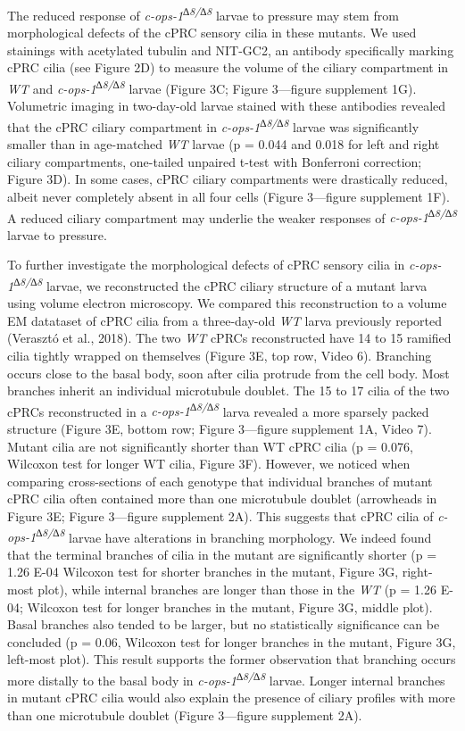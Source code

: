 \documentclass[
  11pt,
]{article}
\begin{document}
The reduced response of \emph{c-ops-1\textsuperscript{∆8/∆8}} larvae to
pressure may stem from morphological defects of the cPRC sensory cilia
in these mutants. We used stainings with acetylated tubulin and NIT-GC2,
an antibody specifically marking cPRC cilia (see Figure 2D) to measure
the volume of the ciliary compartment in \emph{WT} and
\emph{c-ops-1\textsuperscript{∆8/∆8}} larvae (Figure 3C; Figure
3---figure supplement 1G). Volumetric imaging in two-day-old larvae
stained with these antibodies revealed that the cPRC ciliary compartment
in \emph{c-ops-1\textsuperscript{∆8/∆8}} larvae was significantly
smaller than in age-matched \emph{WT} larvae (p = 0.044 and 0.018 for
left and right ciliary compartments, one-tailed unpaired t-test with
Bonferroni correction; Figure 3D). In some cases, cPRC ciliary
compartments were drastically reduced, albeit never completely absent in
all four cells (Figure 3---figure supplement 1F). A reduced ciliary
compartment may underlie the weaker responses of
\emph{c-ops-1\textsuperscript{∆8/∆8}} larvae to pressure.

To further investigate the morphological defects of cPRC sensory cilia
in \emph{c-ops-1\textsuperscript{∆8/∆8}} larvae, we reconstructed the
cPRC ciliary structure of a mutant larva using volume electron
microscopy. We compared this reconstruction to a volume EM datataset of
cPRC cilia from a three-day-old \emph{WT} larva previously reported
(Verasztó et al., 2018). The two \emph{WT} cPRCs reconstructed have 14
to 15 ramified cilia tightly wrapped on themselves (Figure 3E, top row,
Video 6). Branching occurs close to the basal body, soon after cilia
protrude from the cell body. Most branches inherit an individual
microtubule doublet. The 15 to 17 cilia of the two cPRCs reconstructed
in a \emph{c-ops-1\textsuperscript{∆8/∆8}} larva revealed a more
sparsely packed structure (Figure 3E, bottom row; Figure 3---figure
supplement 1A, Video 7). Mutant cilia are not significantly shorter than
WT cPRC cilia (p = 0.076, Wilcoxon test for longer WT cilia, Figure 3F).
However, we noticed when comparing cross-sections of each genotype that
individual branches of mutant cPRC cilia often contained more than one
microtubule doublet (arrowheads in Figure 3E; Figure 3---figure
supplement 2A). This suggests that cPRC cilia of
\emph{c-ops-1\textsuperscript{∆8/∆8}} larvae have alterations in
branching morphology. We indeed found that the terminal branches of
cilia in the mutant are significantly shorter (p = 1.26 E-04 Wilcoxon
test for shorter branches in the mutant, Figure 3G, right-most plot),
while internal branches are longer than those in the \emph{WT} (p = 1.26
E-04; Wilcoxon test for longer branches in the mutant, Figure 3G, middle
plot). Basal branches also tended to be larger, but no statistically
significance can be concluded (p = 0.06, Wilcoxon test for longer
branches in the mutant, Figure 3G, left-most plot). This result supports
the former observation that branching occurs more distally to the basal
body in \emph{c-ops-1\textsuperscript{∆8/∆8}} larvae. Longer internal
branches in mutant cPRC cilia would also explain the presence of ciliary
profiles with more than one microtubule doublet (Figure 3---figure
supplement 2A).
\end{document}
